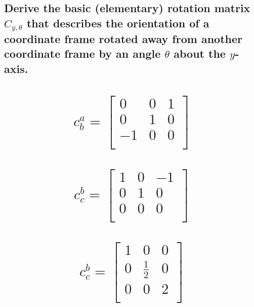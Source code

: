 \documentclass[12pt,letterpaper, onecolumn]{exam}
\begin{document}
\begin{questions}
\begin{parts}
        \part{Derive the basic (elementary) rotation matrix $C_{y,\theta}$ that describes the orientation of a coordinate frame rotated away from another coordinate frame by an angle $\theta$ about the $y$-axis.}
    \end{parts}
    \clearpage
    \begin{parts}
        \part{
            \begin{equation*}
                c^a_b =
                \begin{bmatrix}
                    0  & 0 & 1 \\
                    0  & 1 & 0 \\
                    -1 & 0 & 0 \\
                \end{bmatrix}
            \end{equation*}
        }
        \part{
            \begin{equation*}
                c^b_c =
                \begin{bmatrix}
                    1 & 0 & -1 \\
                    0 & 1 & 0  \\
                    0 & 0 & 0  \\
                \end{bmatrix}
            \end{equation*}
        }
        \part{
            \begin{equation*}
                c^b_c =
                \begin{bmatrix}
                    1 & 0           & 0 \\
                    0 & \frac{1}{2} & 0 \\
                    0 & 0           & 2 \\
                \end{bmatrix}
            \end{equation*}
        }

\end{parts}
\end{questions}
\end{document}
